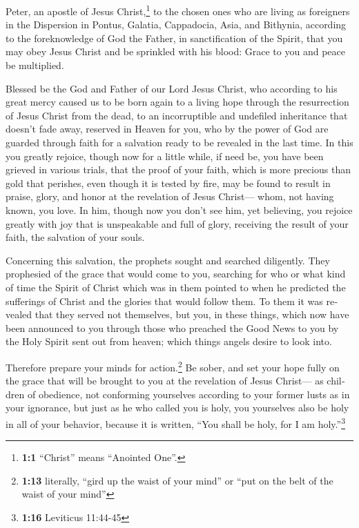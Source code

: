 \begin{paracol}{2}
\begin{otherlanguage}{english}
 Peter, an apostle of Jesus Christ,\footnote{\textbf{1:1}
  ``Christ'' means ``Anointed One''.} to the chosen ones who are living
as foreigners in the Dispersion in Pontus, Galatia, Cappadocia, Asia,
and Bithynia,  according to the foreknowledge of God the
Father, in sanctification of the Spirit, that you may obey Jesus Christ
and be sprinkled with his blood: Grace to you and peace be multiplied.

 Blessed be the God and Father of our Lord Jesus Christ,
who according to his great mercy caused us to be born again to a living
hope through the resurrection of Jesus Christ from the dead,
 to an incorruptible and undefiled inheritance that
doesn't fade away, reserved in Heaven for you,  who by the
power of God are guarded through faith for a salvation ready to be
revealed in the last time.  In this you greatly rejoice,
though now for a little while, if need be, you have been grieved in
various trials,  that the proof of your faith, which is
more precious than gold that perishes, even though it is tested by fire,
may be found to result in praise, glory, and honor at the revelation of
Jesus Christ---  whom, not having known, you love. In him,
though now you don't see him, yet believing, you rejoice greatly with
joy that is unspeakable and full of glory,  receiving the
result of your faith, the salvation of your souls.

 Concerning this salvation, the prophets sought and
searched diligently. They prophesied of the grace that would come to
you,  searching for who or what kind of time the Spirit
of Christ which was in them pointed to when he predicted the sufferings
of Christ and the glories that would follow them.  To
them it was revealed that they served not themselves, but you, in these
things, which now have been announced to you through those who preached
the Good News to you by the Holy Spirit sent out from heaven; which
things angels desire to look into.

 Therefore prepare your minds for action.\footnote{\textbf{1:13}
  literally, ``gird up the waist of your mind'' or ``put on the belt of
  the waist of your mind''} Be sober, and set your hope fully on the
grace that will be brought to you at the revelation of Jesus Christ---
 as children of obedience, not conforming yourselves
according to your former lusts as in your ignorance,  but
just as he who called you is holy, you yourselves also be holy in all of
your behavior,  because it is written, ``You shall be
holy, for I am holy.''\footnote{\textbf{1:16} Leviticus 11:44-45}


\end{otherlanguage}
\end{paracol}
